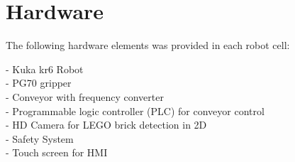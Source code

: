 \section{Hardware}
\label{sec:rc_hardware}
The following hardware elements was provided in each robot cell:

- Kuka kr6 Robot \\
- PG70 gripper\\
- Conveyor with frequency converter\\
- Programmable logic controller (PLC) for conveyor control\\
- HD Camera for LEGO brick detection in 2D\\
- Safety System\\
- Touch screen for HMI\\